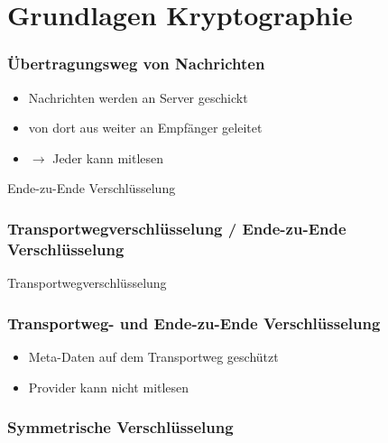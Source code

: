 \section{Grundlagen Kryptographie}


\begin{frame}
  \frametitle{Übertragungsweg von Nachrichten}
  \center {}
  \begin{itemize}
    \item Nachrichten werden an Server geschickt
    \item von dort aus weiter an Empfänger geleitet
    \item $\rightarrow$ Jeder kann mitlesen
  \end{itemize}

\end{frame}

\begin{frame}
  Ende-zu-Ende Verschlüsselung
  \begin{center}
  \end{center}
  
  \frametitle{Transportwegverschlüsselung / Ende-zu-Ende Verschlüsselung}
  Transportwegverschlüsselung
  \begin{center}
  \end{center}
\end{frame}

\begin{frame}
  \frametitle{Transportweg- und Ende-zu-Ende Verschlüsselung}
  \begin{center}
  \end{center}
  \begin{itemize}
    \item Meta-Daten auf dem Transportweg geschützt
    \item Provider kann nicht mitlesen
  \end{itemize}
\end{frame}


\begin{frame}
  \frametitle{Symmetrische Verschlüsselung}
  \center {}
\end{frame}

